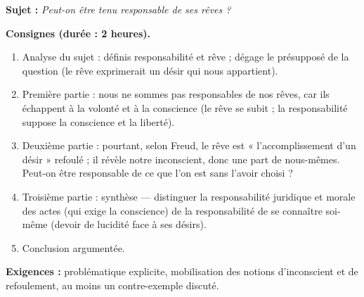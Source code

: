 \documentclass[11pt]{article}
\newcommand{\cle}[1]{{\popxbold\color{popdark}#1}}
\begin{document}
\begin{exercice}
\textbf{Sujet :} \emph{Peut-on être tenu responsable de ses rêves ?}

\textbf{Consignes (durée : 2 heures).}
\begin{enumerate}
\item Analyse du sujet : définis \cle{responsabilité} et \cle{rêve} ; dégage le présupposé de la question (le rêve exprimerait un désir qui nous appartient).
\item Première partie : nous ne sommes pas responsables de nos rêves, car ils échappent à la volonté et à la conscience (le rêve se subit ; la responsabilité suppose la conscience et la liberté).
\item Deuxième partie : pourtant, selon Freud, le rêve est « l'accomplissement d'un désir » refoulé ; il révèle notre inconscient, donc une part de nous-mêmes. Peut-on être responsable de ce que l'on est sans l'avoir choisi ?
\item Troisième partie : synthèse — distinguer la responsabilité juridique et morale des actes (qui exige la conscience) de la responsabilité de se connaître soi-même (devoir de lucidité face à ses désirs).
\item Conclusion argumentée.
\end{enumerate}
\textbf{Exigences :} problématique explicite, mobilisation des notions d'\cle{inconscient} et de \cle{refoulement}, au moins un contre-exemple discuté.
\end{exercice}
\end{document}
